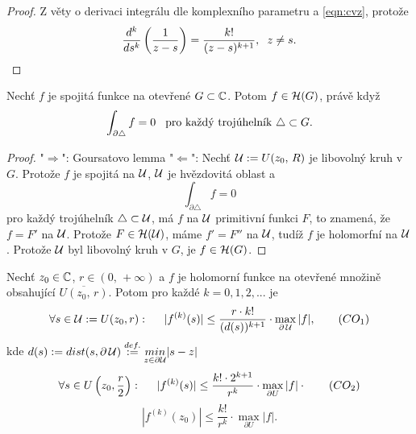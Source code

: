 \begin{proof}
Z věty o derivaci integrálu dle komplexního parametru a \cref{eqn:cvz}, protože 
\[\frac{d^k}{ds^k}\left(\frac{1}{z-s}\right)=
\frac{k!}{(z-s)^{k+1}},\hspace{2mm} z\neq{s}.\]
\end{proof}


\begin{theorem}[Morera]\label{thm:morera}
Nechť $f$ je spojitá funkce na otevřené $G\subset{\operatorname{\mathbb{C}}}$. Potom $f\in\operatorname{\mathcal{H}} (G)$, právě když
\begin{equation}
    \begin{aligned}
\int_{\partial\triangle}{f} =0 \hspace{3mm} \text{pro každý trojúhelník }\triangle\subset{G}.    
    \end{aligned}
    \label{eqn:morera}
\end{equation}
\end{theorem}

\begin{proof}
"$\Rightarrow$": Goursatovo lemma\newline
"$\Leftarrow$": Nechť $\operatorname{\mathcal{U}} :=U(z_0,\, R)$ je libovolný kruh v $G$. Protože $f$ je spojitá na $\operatorname{\mathcal{U}} $, $\operatorname{\mathcal{U}} $ je hvězdovitá oblast a 
\[\int_{\partial\triangle}{f} =0\]
pro každý trojúhelník $\triangle\subset\operatorname{\mathcal{U}} $, má $f$ na $\operatorname{\mathcal{U}} $ primitivní funkci $F$, to znamená, že $f=F'$ na $\operatorname{\mathcal{U}} $. Protože $F\in\operatorname{\mathcal{H}} (\operatorname{\mathcal{U}} )$, máme $f'=F''$ na $\operatorname{\mathcal{U}} $, tudíž $f$ je holomorfní na $\operatorname{\mathcal{U}} $. Protože $\operatorname{\mathcal{U}} $ byl libovolný kruh v $G$, je $f\in\operatorname{\mathcal{H}} (G)$.
\end{proof}


\begin{theorem}
Nechť $z_0\in\operatorname{\mathbb{C}}  $, $r\in(0,\, +\infty)$ a $f$ je holomorní funkce na otevřené množině obsahující $\overline{U(z_0,\, r)}$. Potom pro každé $k=0,1,2,...$ je 
\begin{equation}
\forall{s\in{\operatorname{\mathcal{U}}:=U(z_0,r)}}:\hspace{5mm}|f^{(k)}(s)|\leq\frac{r\cdot k!}{(d(s))^{k+1}}\cdot \max_{\partial\operatorname{\mathcal{U}} }{|f|},    
\tag{$CO_1$}
\label{eqn:co1}
\end{equation}
kde $d(s) := dist(s,\partial\operatorname{\mathcal{U}} )\overset{def.}{:=}\underset{{z\in{\partial{\operatorname{\mathcal{U}}}}}}{min}{|s-z|}$
\begin{equation}
\forall{s\in{U\left(z_0,\frac{r}{2}\right)}}:\hspace{5mm}|f^{(k)}(s)|\leq\frac{k!\cdot2^{k+1}}{r^k}\cdot\max_{\partial{U}}{|f|}\cdot
\tag{$CO_2$}
\label{eqn:co2}
\end{equation}
\begin{equation}
    |f^{(k)}(z_0)|\leq\frac{k!}{r^k}\cdot\max_{\partial{U}}{|f|}. 
\tag{$CO_3$}
\label{eqn:co3}
\end{equation}
\end{theorem}

